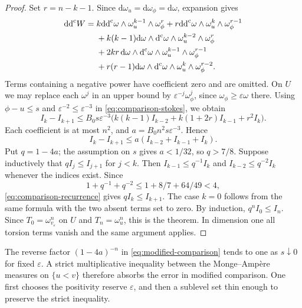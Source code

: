 \begin{proof}
Set $r=n-k-1$. Since $\mathrm{d}\omega_u=\mathrm{d}\omega_\phi=\mathrm{d}\omega$, expansion gives
\[
 \begin{split}
 \mathrm{dd}^{\mathrm{c}} W={}&k\mathrm{dd}^{\mathrm{c}}\omega\wedge\omega_u^{k-1}\wedge\omega_\phi^r
       +r\mathrm{dd}^{\mathrm{c}}\omega\wedge\omega_u^k\wedge\omega_\phi^{r-1}\\
 &+k(k-1)\mathrm{d}\omega\wedge\mathrm d^{\mathrm c}\omega\wedge\omega_u^{k-2}\wedge\omega_\phi^r\\
 &+2kr\,\mathrm{d}\omega\wedge\mathrm d^{\mathrm c}\omega\wedge\omega_u^{k-1}\wedge\omega_\phi^{r-1}\\
 &+r(r-1)\mathrm{d}\omega\wedge\mathrm d^{\mathrm c}\omega\wedge\omega_u^k\wedge\omega_\phi^{r-2}.
 \end{split}
\]
Terms containing a negative power have coefficient zero and are omitted. On $U$ we may replace each $\omega^j$ in an upper bound by $\varepsilon^{-j}\omega_\phi^j$, since $\omega_\phi\geq\varepsilon\omega$ there. Using $\phi-u\leq s$ and $\varepsilon^{-2}\leq\varepsilon^{-3}$ in \eqref{eq:comparison-stokes}, we obtain
\[
 I_k-I_{k+1}\leq B_0s\varepsilon^{-3}
 \bigl(k(k-1)I_{k-2}+k(1+2r)I_{k-1}+r^2I_k\bigr).
\]
Each coefficient is at most $n^2$, and $a=B_0n^2s\varepsilon^{-3}$. Hence
\begin{equation}\label{eq:comparison-recurrence}
 I_k-I_{k+1}\leq a(I_{k-2}+I_{k-1}+I_k).
\end{equation}
Put $q=1-4a$; the assumption on $s$ gives $a<1/32$, so $q>7/8$. Suppose inductively that $qI_j\leq I_{j+1}$ for $j<k$. Then
$I_{k-1}\leq q^{-1}I_k$ and $I_{k-2}\leq q^{-2}I_k$ whenever the indices exist. Since
\[
 1+q^{-1}+q^{-2}\leq1+8/7+64/49<4,
\]
\eqref{eq:comparison-recurrence} gives $qI_k\leq I_{k+1}$. The case $k=0$ follows from the same formula with the two absent terms set to zero. By induction, $q^n I_0\leq I_n$. Since $T_0=\omega_{v_\varepsilon}^n$ on $U$ and $T_n=\omega_u^n$, this is the theorem. In dimension one all torsion terms vanish and the same argument applies.
\end{proof}

The reverse factor $(1-4a)^{-n}$ in \eqref{eq:modified-comparison} tends to one as $s\downarrow0$ for fixed $\varepsilon$. A strict multiplicative inequality between the Monge--Amp\`ere measures on $\{u<v\}$ therefore absorbs the error in modified comparison. One first chooses the positivity reserve $\varepsilon$, and then a sublevel set thin enough to preserve the strict inequality.

